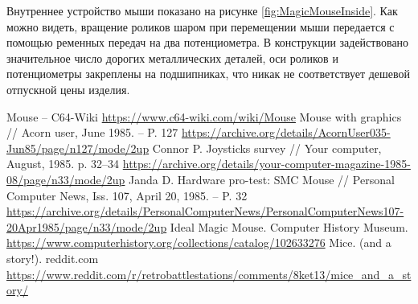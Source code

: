 \documentclass[11pt, a4paper]{article}
\begin{document}
Внутреннее устройство мыши показано на рисунке \ref{fig:MagicMouseInside}. Как можно видеть, вращение роликов шаром при перемещении мыши передается с помощью ременных передач на два потенциометра. В конструкции задействовано значительное число дорогих металлических деталей, оси роликов и потенциометры закреплены на подшипниках, что никак не соответствует дешевой отпускной цены изделия.

\begin{thebibliography}{9}
 Mouse -- C64-Wiki \url{https://www.c64-wiki.com/wiki/Mouse}
 Mouse with graphics // Acorn user, June 1985. -- P. 127 \url{https://archive.org/details/AcornUser035-Jun85/page/n127/mode/2up}
 Connor P. Joysticks survey // Your computer, August, 1985. p. 32--34 \url{https://archive.org/details/your-computer-magazine-1985-08/page/n33/mode/2up}
 Janda D. Hardware pro-test: SMC Mouse // Personal Computer News, Iss. 107, April 20, 1985. -- P. 32 \url{https://archive.org/details/PersonalComputerNews/PersonalComputerNews107-20Apr1985/page/n33/mode/2up}
 Ideal Magic Mouse. Computer History Museum. \url{https://www.computerhistory.org/collections/catalog/102633276}
 Mice. (and a story!). reddit.com
 \url{https://www.reddit.com/r/retrobattlestations/comments/8ket13/mice_and_a_story/}
\end{thebibliography}
\end{document}
